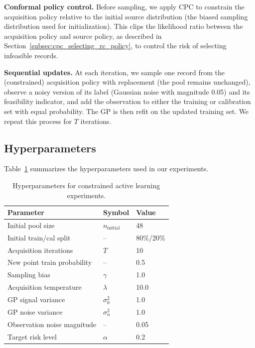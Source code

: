 \textbf{Conformal policy control.} Before sampling, we apply CPC to constrain the acquisition policy relative to the initial source distribution (the biased sampling distribution used for initialization). This clips the likelihood ratio between the acquisition policy and source policy, as described in Section~\ref{subsec:cpc_selecting_rc_policy}, to control the risk of selecting infeasible records.

\textbf{Sequential updates.} At each iteration, we sample one record from the (constrained) acquisition policy with replacement (the pool remains unchanged), observe a noisy version of its label (Gaussian noise with magnitude 0.05) and its feasibility indicator, and add the observation to either the training or calibration set with equal probability. The GP is then refit on the updated training set. We repeat this process for $T$ iterations.

\subsection{Hyperparameters}
\label{subsec:al_hyperparams}

Table~\ref{tab:al_hyperparameters} summarizes the hyperparameters used in our experiments.

\begin{table}[h]
\centering
\caption{Hyperparameters for constrained active learning experiments.}
\label{tab:al_hyperparameters}
\begin{tabular}{lll}
\toprule
\textbf{Parameter} & \textbf{Symbol} & \textbf{Value} \\
\midrule
Initial pool size & $n_{\text{initial}}$ & 48 \\
Initial train/cal split & -- & 80\%/20\% \\
Acquisition iterations & $T$ & 10 \\
New point train probability & -- & 0.5 \\
Sampling bias & $\gamma$ & 1.0 \\
Acquisition temperature & $\lambda$ & 10.0 \\
GP signal variance & $\sigma_0^2$ & 1.0 \\
GP noise variance & $\sigma_n^2$ & 1.0 \\
Observation noise magnitude & -- & 0.05 \\
Target risk level & $\alpha$ & 0.2 \\
\bottomrule
\end{tabular}
\end{table}

\clearpage
